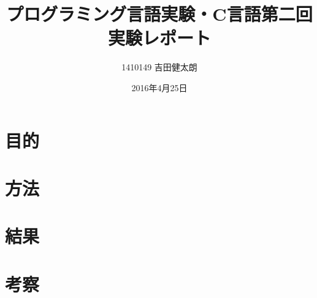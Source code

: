 \documentclass[a4j]{jarticle}
\date{2016年4月25日}
\author{1410149 吉田健太朗}
\title{プログラミング言語実験・C言語第二回実験レポート}
\begin{document}
\maketitle

\section{目的}


\section{方法}




\section{結果}


\section{考察}

\end{document}
